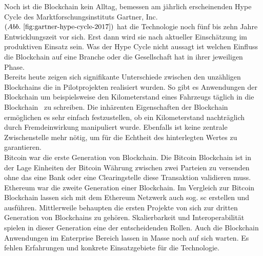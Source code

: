 Noch ist die Blockchain kein Alltag, bemessen am jährlich erscheinenden Hype Cycle des Marktforschungsinstituts Gartner, Inc. $( Abb.~ \ref{fig:gartner-hype-cycle-2017} )$ hat die Technologie noch fünf bis zehn Jahre Entwicklungszeit vor sich. Erst dann wird sie nach aktueller Einschätzung im produktiven Einsatz sein. Was der Hype Cycle nicht aussagt ist welchen Einfluss die Blockchain auf eine Branche oder die Gesellschaft hat in ihrer jeweiligen Phase.\\

Bereits heute zeigen sich signifikante Unterschiede zwischen den unzähligen Blockchains die in Pilotprojekten realisiert wurden. So gibt es Anwendungen der Blockchain um beispielsweise den Kilometerstand eines Fahrzeugs täglich \glqq in die Blockchain\grqq~ zu schreiben. Die inhärenten Eigenschaften der Blockchain ermöglichen es sehr einfach festzustellen, ob ein Kilometerstand nachträglich durch Fremdeinwirkung manipuliert wurde. Ebenfalls ist keine zentrale Zwischenstelle mehr nötig, um für die Echtheit des hinterlegten Wertes zu garantieren. \cite{carVertical}\\

Bitcoin war die erste Generation von Blockchain. Die Bitcoin Blockchain ist in der Lage Einheiten der Bitcoin Währung zwischen zwei Parteien zu versenden ohne das eine Bank oder eine Clearingstelle diese Transaktion validieren muss. \cite[vgl.]{Nakamoto2009} Ethereum war die zweite Generation einer Blockchain. Im Vergleich zur Bitcoin Blockchain lassen sich mit dem Ethereum Netzwerk auch sog. \ac{sc} erstellen und ausführen.\cite[vgl.]{Buterin2014} Mittlerweile behaupten die ersten Projekte von sich zur dritten Generation von Blockchains zu gehören. Skalierbarkeit und Interoperabilität spielen in dieser Generation eine der entscheidenden Rollen. \cite[vgl.]{Cardano} Auch die Blockchain Anwendungen im Enterprise Bereich lassen in Masse noch auf sich warten. Es fehlen Erfahrungen und konkrete Einsatzgebiete für die Technologie.

\newpage
